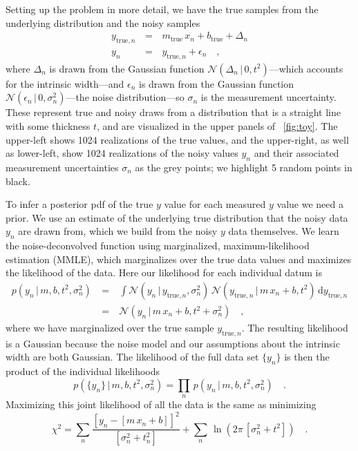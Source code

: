 \documentclass[modern]{aastex61}
\newcommand{\given}{\,|\,}
\newcommand{\true}{\mathrm{true}}
\begin{document}
Setting up the problem in more detail, we have the true samples from the underlying distribution and the noisy samples
\begin{eqnarray}
y_{\true, n} \, &=& \, m_{\true}\,x_n + b_{\true} + \Delta_n \\
y_n \, &=& \, y_{\true,n} + \epsilon_n \quad,
\label{eq:ytrue}
\end{eqnarray}
where $\Delta_n$ is drawn from the Gaussian function $\mathcal{N}(\Delta_n \given 0, t^2)$---which accounts for the intrinsic width---and $\epsilon_n$ is drawn from the Gaussian function $\mathcal{N}(\epsilon_n \given 0, \sigma_n^2)$---the noise distribution---so $\sigma_n$ is the measurement uncertainty.
These represent true and noisy draws from a distribution that is a straight line with some thickness $t$, and are visualized in the upper panels of \figurename~\ref{fig:toy}.
The upper-left shows 1024 realizations of the true values, and the upper-right, as well as lower-left, show 1024 realizations of the noisy values $y_n$ and their associated measurement uncertainties $\sigma_n$ as the grey points; we highlight 5 random points in black.

To infer a posterior pdf of the true $y$ value for each measured $y$ value we need a prior. We use an estimate of the underlying true distribution that the noisy data $y_n$ are drawn from, which we build from the noisy $y$ data themselves.
We learn the noise-deconvolved function using marginalized, maximum-likelihood estimation (MMLE), which marginalizes over the true data values and maximizes the likelihood of the data. Here our likelihood for each individual datum is
\begin{eqnarray}
p(y_n \given m, b, t^2, \sigma_n^2) \ &=& \ \int \mathcal{N}(y_n \given y_{\true,n}, \sigma_n^2) \, \mathcal{N}(y_{\true,n} \given m\,x_n + b, t^2 ) \, \mathrm{d}y_{\true, n} \\
&=&  \ \mathcal{N}(y_n \given m\,x_n + b, t^2 + \sigma_n^2) \quad,
\label{eq:toyLike}
\end{eqnarray}
where we have marginalized over the true sample $y_{\true, n}$. The resulting likelihood is a Gaussian because the noise model and our assumptions about the intrinsic width are both Gaussian. The likelihood of the full data set $\{y_n\}$ is then the product of the individual likelihoods
\begin{equation}
p(\{y_n\} \given m, b, t^2, \sigma_n^2) = \prod_n\, p(y_n \given m, b, t^2, \sigma_n^2) \quad .
\label{eq:toyLikeFull}
\end{equation}
Maximizing this joint likelihood of all the data is the same as minimizing
\begin{equation}
\chi^2 = \sum_n \frac{[y_n - [m\,x_n + b]]^2}{[\sigma_n^2 + t_n^2]} + \sum_n\,\ln(2\pi\,[\sigma_n^2 + t^2])
\quad .
\label{eq:chisq}
\end{equation}
\end{document}
